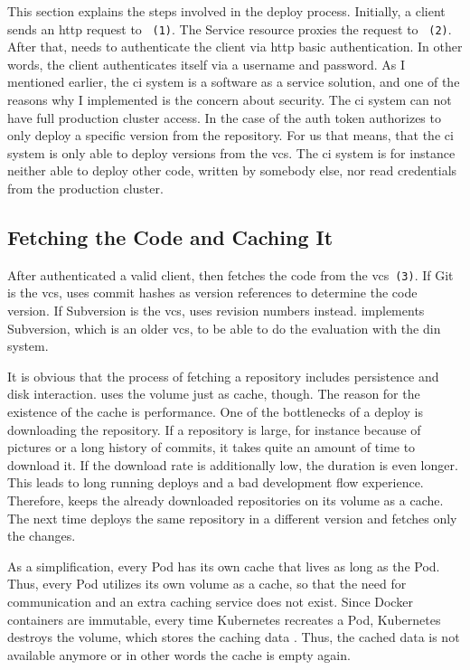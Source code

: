 This section explains the steps involved in the deploy process. Initially, a client
sends an \gls{http} request to \deployer{}~\texttt{(1)}. The Service resource proxies the request
to \deployer{}~\texttt{(2)}. After that, \deployer{} needs to authenticate the client via \gls{http}
basic authentication. In other words, the client authenticates itself via a username and
password. As I mentioned earlier, the \gls{ci} system is a software as a service solution,
and one of the reasons why I implemented \deployer{} is the concern about security. The
\gls{ci} system can not have full production cluster access. In the case of \deployer{} the
auth token authorizes to only deploy a specific version from the repository. For us that
means, that the \gls{ci} system is only able to deploy versions from the \gls{vcs}. The
\gls{ci} system is for instance neither able to deploy other code, written by somebody else, nor read
credentials from the production cluster.

\subsection{Fetching the Code and Caching It}
\label{sec:cache}

After \deployer{} authenticated a valid client, \deployer{} then fetches the code from the
\gls{vcs}~\texttt{(3)}. If Git is the \gls{vcs}, \deployer{} uses commit hashes 
as version references to determine the code version. If Subversion is the \gls{vcs},
\deployer{} uses revision numbers instead. \deployer{} implements Subversion, which is an
older \gls{vcs}, to be able to do the evaluation with the \gls{din} system.

It is obvious that the process of fetching a repository includes persistence and disk
interaction. \deployer{} uses the volume just as cache, though. The reason for the existence
of the cache is performance. One of the bottlenecks of a deploy is downloading the
repository. If a repository is large, for instance because of pictures or a long history
of commits, it takes quite an amount of time to download it. If the download rate is
additionally low, the duration is even longer. This leads to long running deploys and a bad
development flow experience. Therefore, \deployer{} keeps the already downloaded repositories
on its volume as a cache. The next time \deployer{} deploys the same repository in a
different version and \deployer{} fetches only the changes.

As a simplification, every Pod has its own cache that lives as long as the Pod. Thus, every
Pod utilizes its own volume as a cache, so that the need for communication and an extra caching
service does not exist. Since Docker containers are immutable, every time Kubernetes
recreates a Pod, Kubernetes destroys the volume, which stores the caching data . Thus, the cached data is not available
anymore or in other words the cache is empty again.

